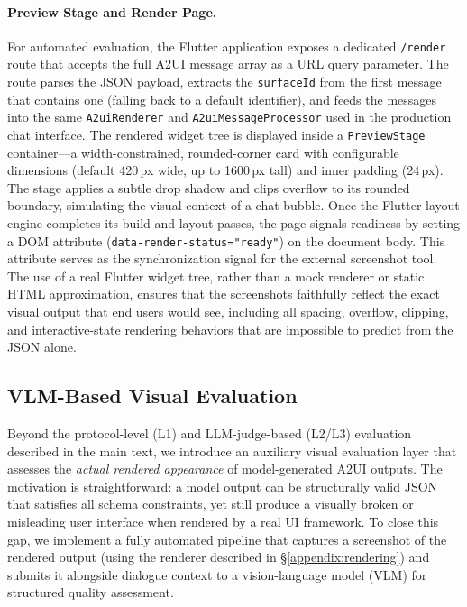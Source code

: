 \documentclass{llmxive}
\begin{document}
\paragraph{Preview Stage and Render Page.}
For automated evaluation, the Flutter application exposes a dedicated \texttt{/render} route that accepts the full A2UI message array as a URL query parameter. The route parses the JSON payload, extracts the \texttt{surfaceId} from the first message that contains one (falling back to a default identifier), and feeds the messages into the same \texttt{A2uiRenderer} and \texttt{A2uiMessageProcessor} used in the production chat interface. The rendered widget tree is displayed inside a \texttt{PreviewStage} container---a width-constrained, rounded-corner card with configurable dimensions (default 420\,px wide, up to 1600\,px tall) and inner padding (24\,px). The stage applies a subtle drop shadow and clips overflow to its rounded boundary, simulating the visual context of a chat bubble. Once the Flutter layout engine completes its build and layout passes, the page signals readiness by setting a DOM attribute (\texttt{data-render-status="ready"}) on the document body. This attribute serves as the synchronization signal for the external screenshot tool. The use of a real Flutter widget tree, rather than a mock renderer or static HTML approximation, ensures that the screenshots faithfully reflect the exact visual output that end users would see, including all spacing, overflow, clipping, and interactive-state rendering behaviors that are impossible to predict from the JSON alone.


\subsection{VLM-Based Visual Evaluation}
\label{appendix:visual-eval}

Beyond the protocol-level (L1) and LLM-judge-based (L2/L3) evaluation described in the main text, we introduce an auxiliary visual evaluation layer that assesses the \emph{actual rendered appearance} of model-generated A2UI outputs. The motivation is straightforward: a model output can be structurally valid JSON that satisfies all schema constraints, yet still produce a visually broken or misleading user interface when rendered by a real UI framework. To close this gap, we implement a fully automated pipeline that captures a screenshot of the rendered output (using the renderer described in \S\ref{appendix:rendering}) and submits it alongside dialogue context to a vision-language model (VLM) for structured quality assessment.
\end{document}
